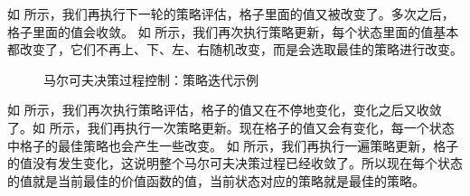 如 所示，我们再执行下一轮的策略评估，格子里面的值又被改变了。多次之后，格子里面的值会收敛。
如 所示，我们再次执行策略更新，每个状态里面的值基本都改变了，它们不再上、下、左、右随机改变，而是会选取最佳的策略进行改变。
\begin{figure}[hbt]
  \centering
  \caption{马尔可夫决策过程控制：策略迭代示例}
  \label{fig:}
\end{figure}

如 所示，我们再次执行策略评估，格子的值又在不停地变化，变化之后又收敛了。如 所示，我们再执行一次策略更新。现在格子的值又会有变化，每一个状态中格子的最佳策略也会产生一些改变。
如 所示，我们再执行一遍策略更新，格子的值没有发生变化，这说明整个马尔可夫决策过程已经收敛了。所以现在每个状态的值就是当前最佳的价值函数的值，当前状态对应的策略就是最佳的策略。

